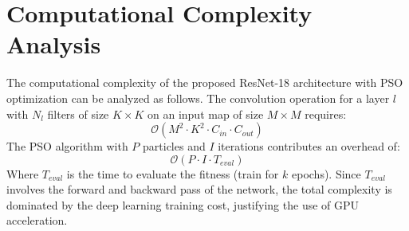 \documentclass[11pt, a4paper]{article}
\begin{document}
\section{Computational Complexity Analysis}
The computational complexity of the proposed ResNet-18 architecture with PSO optimization can be analyzed as follows.
The convolution operation for a layer $l$ with $N_l$ filters of size $K \times K$ on an input map of size $M \times M$ requires:
\begin{equation}
\mathcal{O}(M^2 \cdot K^2 \cdot C_{in} \cdot C_{out})
\end{equation}
The PSO algorithm with $P$ particles and $I$ iterations contributes an overhead of:
\begin{equation}
\mathcal{O}(P \cdot I \cdot T_{eval})
\end{equation}
Where $T_{eval}$ is the time to evaluate the fitness (train for $k$ epochs). Since $T_{eval}$ involves the forward and backward pass of the network, the total complexity is dominated by the deep learning training cost, justifying the use of GPU acceleration.
\end{document}
